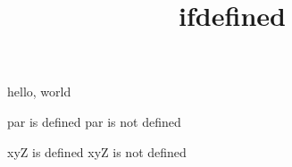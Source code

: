 \documentclass{amsart}
\title{ifdefined}
\begin{document}
\maketitle

hello, world

\ifdefined\par
    par is defined
\else
    par is not defined
\fi

\ifdefined\xyZ
    xyZ is defined
\else
    xyZ is not defined
\fi
\end{document}
